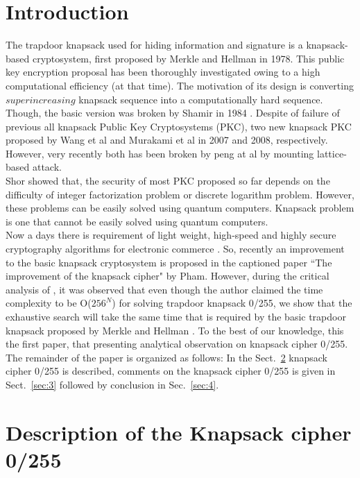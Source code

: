 \documentclass[5p,times,twocolumn]{elsarticle}
\begin{document}
\section{Introduction}
\label{intro}
The trapdoor knapsack used for hiding information and signature is a knapsack-based cryptosystem, first proposed by Merkle and Hellman \cite{merkle1978hiding} in 1978. This public key encryption proposal has been thoroughly investigated owing to a high computational efficiency (at that time). The motivation of its design is converting $superincreasing$ knapsack sequence into a computationally hard sequence. Though, the basic version was broken by Shamir in 1984 \cite{shamir1984polynomial}. Despite of failure of previous all knapsack Public Key Cryptosystems (PKC), two new knapsack PKC proposed by Wang et al \cite{wang2007knapsack} and Murakami et al \cite{murakami2008new} in 2007 and 2008, respectively. However, very recently both has been broken by peng at al \cite{peng2013analysis} by mounting lattice-based attack.\\
\indent Shor \cite{shor1997polynomial} showed that, the security of most PKC proposed so far depends on the difficulty of integer factorization problem or discrete logarithm problem. However, these problems can be easily solved using quantum computers. Knapsack problem is one that cannot be easily solved using quantum computers.\\ 
\indent Now a days there is requirement of light weight, high-speed and highly secure cryptography algorithms for electronic commerce \cite{hamilton1997commerce}. So, recently an improvement to the basic knapsack cryptosystem is proposed in the captioned paper ``The improvement of the knapsack cipher" by Pham\cite{pham2011improvement}. However, during the critical analysis of \cite{pham2011improvement}, it was observed that even though the author claimed the time complexity to be O($256^{N}$) for solving trapdoor knapsack 0/255, we show that the exhaustive search will take the same time that is required by the basic trapdoor knapsack proposed by Merkle and Hellman \cite{merkle1978hiding}. To the best of our knowledge, this the first paper, that presenting analytical observation on knapsack cipher 0/255.\\ 
\indent The remainder of the paper is organized as follows: In the Sect.~\ref{sec:2} knapsack cipher 0/255 is described, comments on the knapsack cipher 0/255 is given in Sect.~\ref{sec:3} followed by conclusion in Sec.~\ref{sec:4}.

\section{Description of the Knapsack cipher 0/255}
\label{sec:2}
\end{document}
